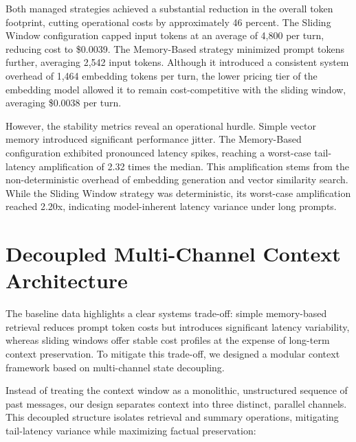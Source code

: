 \documentclass[11pt,journal,onecolumn]{article}
\begin{document}
Both managed strategies achieved a substantial reduction in the overall token footprint, cutting operational costs by approximately 46 percent. The Sliding Window configuration capped input tokens at an average of 4,800 per turn, reducing cost to \$0.0039. The Memory-Based strategy minimized prompt tokens further, averaging 2,542 input tokens. Although it introduced a consistent system overhead of 1,464 embedding tokens per turn, the lower pricing tier of the embedding model allowed it to remain cost-competitive with the sliding window, averaging \$0.0038 per turn.

However, the stability metrics reveal an operational hurdle. Simple vector memory introduced significant performance jitter. The Memory-Based configuration exhibited pronounced latency spikes, reaching a worst-case tail-latency amplification of 2.32 times the median. This amplification stems from the non-deterministic overhead of embedding generation and vector similarity search. While the Sliding Window strategy was deterministic, its worst-case amplification reached 2.20x, indicating model-inherent latency variance under long prompts.

\section{Decoupled Multi-Channel Context Architecture}
The baseline data highlights a clear systems trade-off: simple memory-based retrieval reduces prompt token costs but introduces significant latency variability, whereas sliding windows offer stable cost profiles at the expense of long-term context preservation. To mitigate this trade-off, we designed a modular context framework based on multi-channel state decoupling.

Instead of treating the context window as a monolithic, unstructured sequence of past messages, our design separates context into three distinct, parallel channels. This decoupled structure isolates retrieval and summary operations, mitigating tail-latency variance while maximizing factual preservation:
\end{document}
